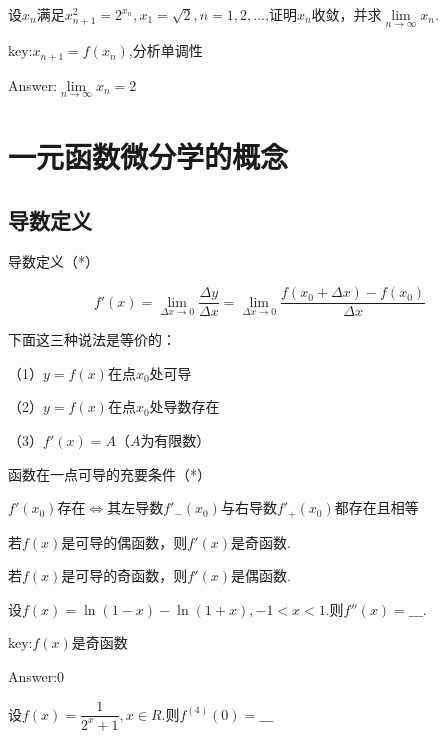 \documentclass[12pt, a4paper, oneside]{ctexbook}
\begin{document}
\hspace*{\fill}


设{$x_n$}满足$x_{n+1}^2=2^{x_n},x_1=\sqrt{2},n=1,2,...$,证明{$x_n$}收敛，并求$\lim\limits_{n \to \infty}x_n$.

key:$x_{n+1}=f(x_n)$,分析单调性

Answer:$\lim\limits_{n \to \infty}x_n=2$

\hspace*{\fill}



\chapter{一元函数微分学的概念}

\section{导数定义}

导数定义（*）

\[f'(x)=\lim\limits_{\Delta x \to 0}\dfrac{\Delta y}{\Delta x}=\lim\limits_{\Delta x \to 0}\dfrac{f(x_0+\Delta x)-f(x_0)}{\Delta x} \]

\hspace*{\fill}

下面这三种说法是等价的：

（1）$y=f(x)$在点$x_0$处可导

（2）$y=f(x)$在点$x_0$处导数存在

（3）$f'(x)=A$（$A$为有限数）


\hspace*{\fill}


函数在一点可导的充要条件（*）

$f'(x_0)$存在$\iff$其左导数$f'_{-}(x_0)$与右导数$f'_{+}(x_0)$都存在且相等

\hspace*{\fill}

若$f(x)$是可导的偶函数，则$f'(x)$是奇函数.

若$f(x)$是可导的奇函数，则$f'(x)$是偶函数.

\hspace*{\fill}

设$f(x)=\ln (1-x) -\ln(1+x),-1<x<1$.则$f''(x)=\_\_\_$.

key:$f(x)$是奇函数

Answer:0

\hspace*{\fill}


设$f(x)=\dfrac{1}{2^x+1},x\in R$.则$f^{(4)}(0)=\_\_\_$
\end{document}
